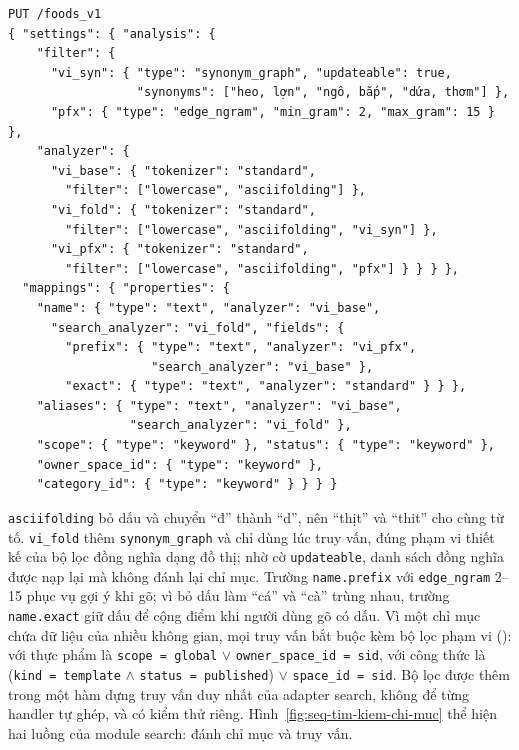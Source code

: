 \begin{Verbatim}
PUT /foods_v1
{ "settings": { "analysis": {
    "filter": {
      "vi_syn": { "type": "synonym_graph", "updateable": true,
                  "synonyms": ["heo, lợn", "ngô, bắp", "dứa, thơm"] },
      "pfx": { "type": "edge_ngram", "min_gram": 2, "max_gram": 15 } },
    "analyzer": {
      "vi_base": { "tokenizer": "standard",
        "filter": ["lowercase", "asciifolding"] },
      "vi_fold": { "tokenizer": "standard",
        "filter": ["lowercase", "asciifolding", "vi_syn"] },
      "vi_pfx": { "tokenizer": "standard",
        "filter": ["lowercase", "asciifolding", "pfx"] } } } },
  "mappings": { "properties": {
    "name": { "type": "text", "analyzer": "vi_base",
      "search_analyzer": "vi_fold", "fields": {
        "prefix": { "type": "text", "analyzer": "vi_pfx",
                    "search_analyzer": "vi_base" },
        "exact": { "type": "text", "analyzer": "standard" } } },
    "aliases": { "type": "text", "analyzer": "vi_base",
                 "search_analyzer": "vi_fold" },
    "scope": { "type": "keyword" }, "status": { "type": "keyword" },
    "owner_space_id": { "type": "keyword" },
    "category_id": { "type": "keyword" } } } }
\end{Verbatim}

\texttt{asciifolding} bỏ dấu và chuyển “đ” thành “d”, nên “thịt” và “thit” cho cùng từ tố. \texttt{vi\_fold} thêm \texttt{synonym\_graph} và chỉ dùng lúc truy vấn, đúng phạm vi thiết kế của bộ lọc đồng nghĩa dạng đồ thị; nhờ cờ \texttt{updateable}, danh sách đồng nghĩa được nạp lại mà không đánh lại chỉ mục. Trường \texttt{name.prefix} với \texttt{edge\_ngram} 2–15 phục vụ gợi ý khi gõ; vì bỏ dấu làm “cá” và “cà” trùng nhau, trường \texttt{name.exact} giữ dấu để cộng điểm khi người dùng gõ có dấu. Vì một chỉ mục chứa dữ liệu của nhiều không gian, mọi truy vấn bắt buộc kèm bộ lọc phạm vi (): với thực phẩm là \texttt{scope = global} $\lor$ \texttt{owner\_space\_id = sid}, với công thức là (\texttt{kind = template} $\land$ \texttt{status = published}) $\lor$ \texttt{space\_id = sid}. Bộ lọc được thêm trong một hàm dựng truy vấn duy nhất của adapter search, không để từng handler tự ghép, và có kiểm thử riêng. Hình~\ref{fig:seq-tim-kiem-chi-muc} thể hiện hai luồng của module search: đánh chỉ mục và truy vấn.


